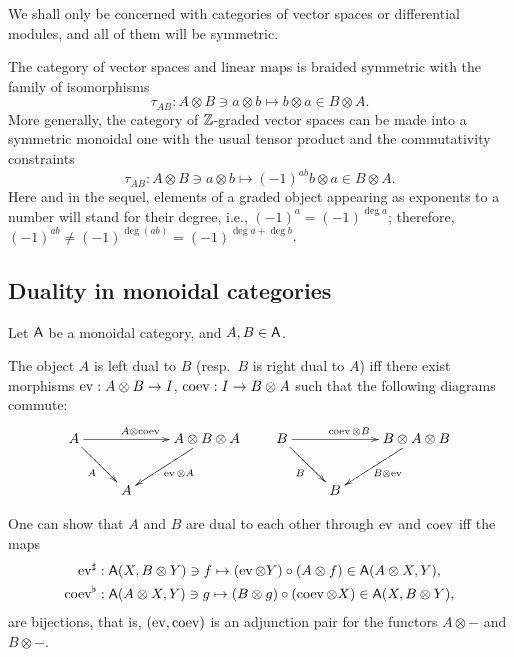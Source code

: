We shall only be concerned with categories of vector spaces or
differential modules, and all of them will be symmetric.
\begin{example}
  \label{xmp:vec1}
  The category of vector spaces and linear maps is braided symmetric
  with the family of isomorphisms
  \begin{equation*}
    \tau_{AB}: A\otimes B \ni a\otimes b \mapsto b\otimes a \in B\otimes A.
  \end{equation*}
  More generally, the category of $\mathbb{Z}$-graded vector spaces can be
  made into a symmetric monoidal one with the usual tensor product and
  the commutativity constraints
  \begin{equation*}
    \tau_{AB}: A\otimes B \ni a\otimes b \mapsto (-1)^{ab}b\otimes a \in B\otimes A.
  \end{equation*}
  Here and in the sequel, elements of a graded object appearing as
  exponents to a number will stand for their degree, i.e., \((-1)^a =
  (-1)^{\deg a}\); therefore, \((-1)^{ab} \not= (-1)^{\deg (ab)} =
  (-1)^{\deg a + \deg b}\).
\end{example}


\subsection{Duality in monoidal categories}
\label{sec:duality}

Let $\mathsf{A}$ be a monoidal category, and $A,B \in \mathsf{A}$.
\begin{definition}
  The object $A$ is left dual to $B$ (resp.\ $B$ is right dual to $A$)
  iff there exist morphisms $\operatorname{ev}: A\otimes B \to I$, $\operatorname{coev}: I \to B\otimes A$ such
  that the following diagrams commute:
  \begin{equation*}
    \xymatrix{%
      A
      &
      &
      A\otimes B\otimes A
      \\
      &
      A
      &
      \ar "1,1";"1,3" ^{A\otimes\coev}
      \ar "1,1";"2,2" _{A}
      \ar "1,3";"2,2" ^{\ev\otimes A}
      }
    \qquad
    \xymatrix{%
      B
      &
      &
      B\otimes A\otimes B
      \\
      &
      B
      &
      \ar "1,1";"1,3" ^{\coev\otimes B}
      \ar "1,1";"2,2" _{B}
      \ar "1,3";"2,2" ^{B\otimes\ev}
      }
  \end{equation*}
\end{definition}
One can show that $A$ and $B$ are dual to each other through $\operatorname{ev}$ and
$\operatorname{coev}$ iff the maps
\begin{align*}
  \operatorname{ev}^\sharp   &: \mathsf{A}(X,B\otimes Y) \ni f \mapsto (\operatorname{ev}\otimes Y)\circ(A\otimes f) \in \mathsf{A}(A\otimes X, Y),
  \\
  \operatorname{coev}^\flat &: \mathsf{A}(A\otimes X,Y) \ni g \mapsto (B\otimes g)\circ(\operatorname{coev}\otimes X) \in \mathsf{A}(X, B\otimes Y),
\end{align*}
are bijections, that is, $(\operatorname{ev}, \operatorname{coev})$ is an adjunction pair for the
functors $A\otimes-$ and $B\otimes-$.


